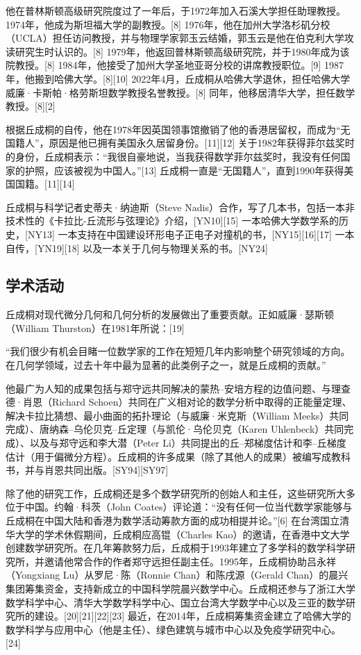他在普林斯顿高级研究院度过了一年后，于1972年加入石溪大学担任助理教授。1974年，他成为斯坦福大学的副教授。[8] 1976年，他在加州大学洛杉矶分校（UCLA）担任访问教授，并与物理学家郭玉云结婚，郭玉云是他在伯克利大学攻读研究生时认识的。[8] 1979年，他返回普林斯顿高级研究院，并于1980年成为该院教授。[8] 1984年，他接受了加州大学圣地亚哥分校的讲席教授职位。[9] 1987年，他搬到哈佛大学。[8][10] 2022年4月，丘成桐从哈佛大学退休，担任哈佛大学威廉·卡斯帕·格劳斯坦数学教授名誉教授。[8] 同年，他移居清华大学，担任数学教授。[8][2]

根据丘成桐的自传，他在1978年因英国领事馆撤销了他的香港居留权，而成为“无国籍人”，原因是他已拥有美国永久居留身份。[11][12] 关于1982年获得菲尔兹奖时的身份，丘成桐表示：“我很自豪地说，当我获得数学菲尔兹奖时，我没有任何国家的护照，应该被视为中国人。”[13] 丘成桐一直是“无国籍人”，直到1990年获得美国国籍。[11][14]

丘成桐与科学记者史蒂夫·纳迪斯（Steve Nadis）合作，写了几本书，包括一本非技术性的《卡拉比-丘流形与弦理论》介绍，[YN10][15] 一本哈佛大学数学系的历史，[NY13] 一本支持在中国建设环形电子正电子对撞机的书，[NY15][16][17] 一本自传，[YN19][18] 以及一本关于几何与物理关系的书。[NY24]
\subsection{学术活动}  
丘成桐对现代微分几何和几何分析的发展做出了重要贡献。正如威廉·瑟斯顿（William Thurston）在1981年所说：[19]

“我们很少有机会目睹一位数学家的工作在短短几年内影响整个研究领域的方向。在几何学领域，过去十年中最为显著的此类例子之一，就是丘成桐的贡献。”

他最广为人知的成果包括与郑守远共同解决的蒙热–安培方程的边值问题、与理查德·肖恩（Richard Schoen）共同在广义相对论的数学分析中取得的正能量定理、解决卡拉比猜想、最小曲面的拓扑理论（与威廉·米克斯（William Meeks）共同完成）、唐纳森–乌伦贝克–丘定理（与凯伦·乌伦贝克（Karen Uhlenbeck）共同完成）、以及与郑守远和李大潜（Peter Li）共同提出的丘–郑梯度估计和李–丘梯度估计（用于偏微分方程）。丘成桐的许多成果（除了其他人的成果）被编写成教科书，并与肖恩共同出版。[SY94][SY97]

除了他的研究工作，丘成桐还是多个数学研究所的创始人和主任，这些研究所大多位于中国。约翰·科茨（John Coates）评论道：“没有任何一位当代数学家能够与丘成桐在中国大陆和香港为数学活动筹款方面的成功相提并论。”[6] 在台湾国立清华大学的学术休假期间，丘成桐应高锟（Charles Kao）的邀请，在香港中文大学创建数学研究所。在几年筹款努力后，丘成桐于1993年建立了多学科的数学科学研究所，并邀请他常合作的作者郑守远担任副主任。1995年，丘成桐协助吕永祥（Yongxiang Lu）从罗尼·陈（Ronnie Chan）和陈戌源（Gerald Chan）的晨兴集团筹集资金，支持新成立的中国科学院晨兴数学中心。丘成桐还参与了浙江大学数学科学中心、清华大学数学科学中心、国立台湾大学数学中心以及三亚的数学研究所的建设。[20][21][22][23] 最近，在2014年，丘成桐筹集资金建立了哈佛大学的数学科学与应用中心（他是主任）、绿色建筑与城市中心以及免疫学研究中心。[24]

